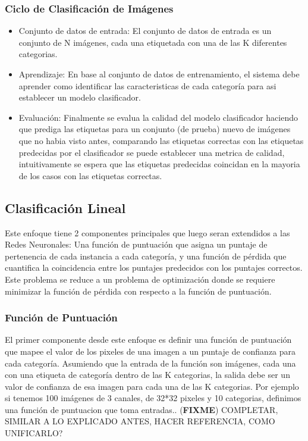 \documentclass[a4paper,11pt,spanish]{book}
\newcommand*{\FIXME}[1]{{(\textbf{FIXME}) {#1}}}
\begin{document}
	\subsubsection {Ciclo de Clasificación de Imágenes}
	  \begin{itemize}
	    \item Conjunto de datos de entrada: El conjunto de datos de entrada es un conjunto de N imágenes, cada una etiquetada con una de las K diferentes categorias.  
	    \item Aprendizaje: En base al conjunto de datos de entrenamiento, el sistema debe aprender como identificar las caracteristicas de cada categoría para asi establecer un modelo clasificador.
	    \item Evaluación: Finalmente se evalua la calidad del modelo clasificador haciendo que prediga las etiquetas para un conjunto (de prueba) nuevo de imágenes que no habia visto antes, comparando las 
	    etiquetas correctas con las etiquetas predecidas por el clasificador se puede establecer una metrica de calidad, intuitivamente se espera que las etiquetas predecidas coincidan en la mayoria
	    de los casos con las etiquetas correctas.
	  \end{itemize}
      
    \subsection{Clasificación Lineal}
      Este enfoque tiene 2 componentes principales que luego seran extendidos a las Redes Neuronales: Una función de puntuación que asigna un puntaje de pertenencia de cada instancia a cada categoría, 
      y una función de pérdida que cuantifica la coincidencia entre los puntajes predecidos con los puntajes correctos.
      Este problema se reduce a un problema de optimización donde se requiere minimizar la función de pérdida con respecto a la función de puntuación.

      \subsubsection{Función de Puntuación}
	El primer componente desde este enfoque es definir una función de  puntuación que mapee el valor de los pixeles de una imagen a un puntaje de confianza para cada categoría.
	Asumiendo que la entrada de la función son imágenes, cada una con una etiqueta de categoría dentro de las K categorias, la salida debe ser un valor de confianza de esa imagen 
	para cada una de las K categorias.
	Por ejemplo si tenemos 100 imágenes de 3 canales, de 32*32 pixeles y 10 categorias, definimos una función de puntuacion que toma entradas..
	\FIXME{COMPLETAR, SIMILAR A LO EXPLICADO ANTES, HACER REFERENCIA, COMO UNIFICARLO?}
\end{document}
